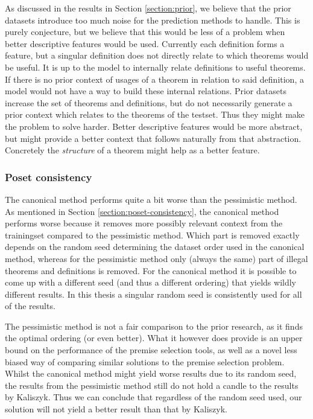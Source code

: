 As discussed in the results in Section \ref{section:prior}, we believe that the prior datasets introduce
too much noise for the prediction methods to handle.
This is purely conjecture, but we believe that this would be less of a problem when
better descriptive features would be used.
Currently each definition forms a feature, but a singular definition does not directly relate
to which theorems would be useful.
It is up to the model to internally relate definitions to useful theorems.
If there is no prior context of usages of a theorem in relation to said definition,
a model would not have a way to build these internal relations.
Prior datasets increase the set of theorems and definitions, but do not necessarily
generate a prior context which relates to the theorems of the testset.
Thus they might make the problem to solve harder.
Better descriptive features would be more abstract, but might provide a better context that follows
naturally from that abstraction.
Concretely the \emph{structure} of a theorem might help as a better feature.

\subsubsection{Poset consistency}
The canonical method performs quite a bit worse than the pessimistic method.
As mentioned in Section \ref{section:poset-consistency}, the canonical method performs
worse because it removes more possibly relevant context from the trainingset compared to the
pessimistic method.
Which part is removed exactly depends on the random seed determining the dataset order used
in the canonical method, whereas for the pessimistic method only (always the same) part of
illegal theorems and definitions is removed.
For the canonical method it is possible to come up with a different seed (and thus a different ordering)
that yields wildly different results.
In this thesis a singular random seed is consistently used for all of the results.

The pessimistic method is not a fair comparison to the prior research, as it finds
the optimal ordering (or even better). What it however does provide is an upper
bound on the performance of the premise selection tools, as well as a novel less biased
way of comparing similar solutions to the premise selection problem.
Whilst the canonical method might yield worse results due to its
random seed, the results from the pessimistic method still do not hold a candle to
the results by Kaliszyk.
Thus we can conclude that regardless of the random seed used, our solution will
not yield a better result than that by Kaliszyk.

